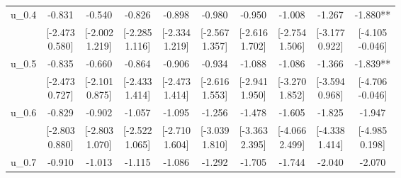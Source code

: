 {\begin{tabular}{lccccccccc}
u\_0.4 & -0.831 & -0.540 & -0.826 & -0.898 & -0.980 & -0.950 & -1.008 & -1.267 & -1.880** \\
 & \shortstack{[-2.473\\0.580]} & \shortstack{[-2.002\\1.219]} & \shortstack{[-2.285\\1.116]} & \shortstack{[-2.334\\1.219]} & \shortstack{[-2.567\\1.357]} & \shortstack{[-2.616\\1.702]} & \shortstack{[-2.754\\1.506]} & \shortstack{[-3.177\\0.922]} & \shortstack{[-4.105\\-0.046]} \\[0.25em]
u\_0.5 & -0.835 & -0.660 & -0.864 & -0.906 & -0.934 & -1.088 & -1.086 & -1.366 & -1.839** \\
 & \shortstack{[-2.473\\0.727]} & \shortstack{[-2.101\\0.875]} & \shortstack{[-2.433\\1.414]} & \shortstack{[-2.473\\1.414]} & \shortstack{[-2.616\\1.553]} & \shortstack{[-2.941\\1.950]} & \shortstack{[-3.270\\1.852]} & \shortstack{[-3.594\\0.968]} & \shortstack{[-4.706\\-0.046]} \\[0.25em]
u\_0.6 & -0.829 & -0.902 & -1.057 & -1.095 & -1.256 & -1.478 & -1.605 & -1.825 & -1.947 \\
 & \shortstack{[-2.803\\0.880]} & \shortstack{[-2.803\\1.070]} & \shortstack{[-2.522\\1.065]} & \shortstack{[-2.710\\1.604]} & \shortstack{[-3.039\\1.810]} & \shortstack{[-3.363\\2.395]} & \shortstack{[-4.066\\2.499]} & \shortstack{[-4.338\\1.414]} & \shortstack{[-4.985\\0.198]} \\[0.25em]
u\_0.7 & -0.910 & -1.013 & -1.115 & -1.086 & -1.292 & -1.705 & -1.744 & -2.040 & -2.070 \\

\end{tabular}}
